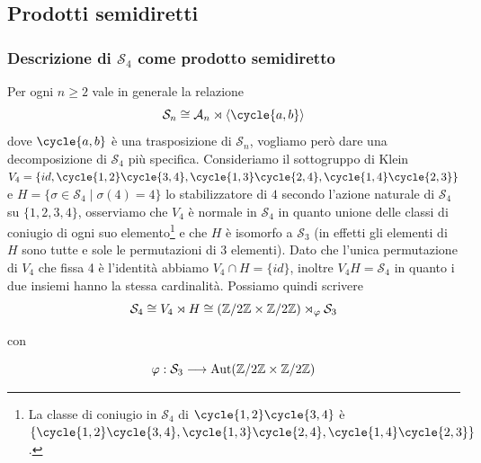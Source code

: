 \documentclass[11pt]{scrartcl}
\begin{document}
	\newpage
	
	\subsection{Prodotti semidiretti}
	
	\subsubsection{Descrizione di \texorpdfstring{$\mathcal{S}_4$}{S₄} come prodotto semidiretto}
	
	Per ogni $n \geq 2$ vale in generale la relazione 
	\[
	\mathcal{S}_n \cong \mathcal{A}_n \rtimes \langle\cycle{a, b}\rangle
	\]
	dove $\cycle{a, b}$ è una trasposizione di $\mathcal{S}_n$, vogliamo però dare una
	decomposizione di $\mathcal{S}_4$ più specifica. \newline
	Consideriamo il sottogruppo di Klein $V_4 = \{id, \cycle{1, 2}\cycle{3, 4}, \cycle{1, 3}\cycle{2, 4},
	\cycle{1, 4}\cycle{2, 3}\}$ e $H = \{\sigma \in \mathcal{S}_4\mid \sigma(4) = 4\}$ lo 
	stabilizzatore di $4$ secondo l'azione naturale di $\mathcal{S}_4$ su $\{1, 2, 3, 4\}$,
	osserviamo che $V_4$ è normale in $\mathcal{S}_4$ in quanto
	unione delle classi di coniugio di ogni suo elemento\footnote{
		La classe di coniugio in $\mathcal{S}_4$ di $\cycle{1, 2}\cycle{3, 4}$ è 
		$\{\cycle{1, 2}\cycle{3, 4}, \cycle{1, 3}\cycle{2, 4}, \cycle{1, 4}\cycle{2, 3}\}$.
	}
	e che $H$ è isomorfo a $\mathcal{S}_3$ (in effetti gli elementi di $H$ sono tutte e 
	sole le permutazioni di 3 elementi). Dato che l'unica permutazione di $V_4$
	che fissa 4 è l'identità abbiamo $V_4 \cap H = \{id\}$, inoltre $V_4H = \mathcal{S}_4$
	in quanto i due insiemi hanno la stessa cardinalità. Possiamo quindi scrivere
	\[
	\mathcal{S}_4 \cong V_4 \rtimes H \cong (\mathbb{Z}/{2}\mathbb{Z} \times \mathbb{Z}/{2}\mathbb{Z}) \rtimes_{\varphi} \mathcal{S}_3
	\]
	
	con
	
	\[
	\varphi: \mathcal{S}_3 \longrightarrow \operatorname{Aut}(\mathbb{Z}/{2}\mathbb{Z}\times\mathbb{Z}/{2}\mathbb{Z})
	\]
	
\end{document}
